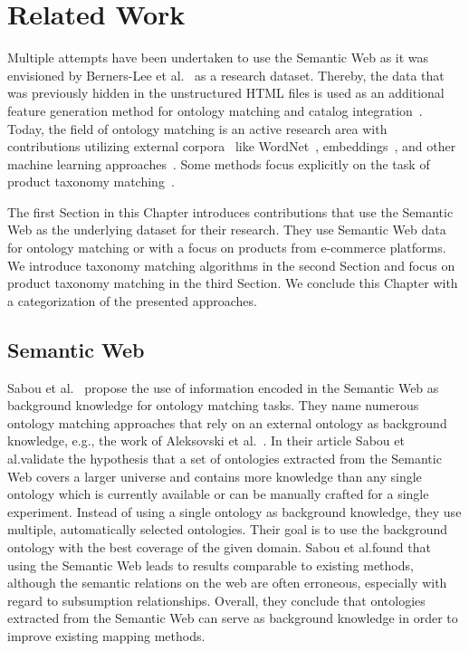 \chapter{Related Work}
\label{ch:related-work}

Multiple attempts have been undertaken to use the Semantic Web as it was envisioned by Berners-Lee et al.\@~\cite{berners2001semantic}
as a research dataset.
Thereby, the data that was previously hidden in the unstructured HTML files is used as an additional feature generation method
for ontology matching and catalog integration~\cite{meusel2015exploiting, sabou2008exploring}.
Today, the field of ontology matching is an active research area with contributions utilizing external
corpora~\cite{giunchiglia2005semantic, park2007ontology, aanen2012schema} like WordNet~\cite{miller1995wordnet},
embeddings~\cite{zhang2014ontology, portisch2018alod2vec}, and other machine learning approaches~\cite{doan2004ontology}.
Some methods focus explicitly on the task of product taxonomy matching~\cite{vandic2012faceted, park2007ontology, aanen2012schema}.

The first Section in this Chapter introduces contributions that use the Semantic Web as the underlying dataset for their research.
They use Semantic Web data for ontology matching or with a focus on products from e-commerce platforms.
We introduce taxonomy matching algorithms in the second Section and focus on product taxonomy matching in the
third Section.
We conclude this Chapter with a categorization of the presented approaches.

\section{Semantic Web}
\label{sec:rw-semantic-web}

Sabou et al.\@~\cite{sabou2008exploring} propose the use of information encoded in the Semantic Web as background
knowledge for ontology matching tasks.
They name numerous ontology matching approaches that rely on an external ontology as background knowledge,
e.g., the work of Aleksovski et al.\@~\cite{aleksovski2006matching}.
In their article Sabou et al.\@ validate the hypothesis that a set of ontologies extracted from the
Semantic Web covers a larger universe and contains more knowledge than any single ontology which is currently available or
can be manually crafted for a single experiment.
Instead of using a single ontology as background knowledge, they use multiple, automatically selected ontologies.
Their goal is to use the background ontology with the best coverage of the given domain.
Sabou et al.\@ found that using the Semantic Web leads to results comparable to existing methods, although
the semantic relations on the web are often erroneous, especially with regard to subsumption relationships.
Overall, they conclude that ontologies extracted from the Semantic Web can serve as background knowledge in order
to improve existing mapping methods.

